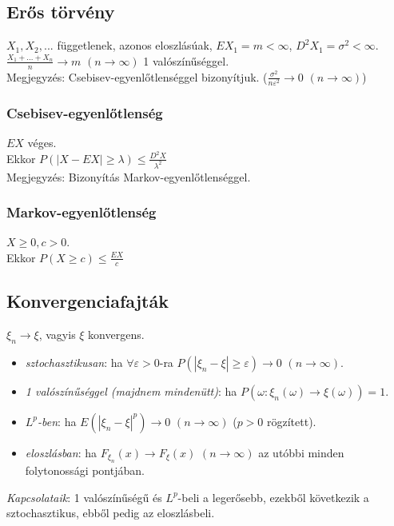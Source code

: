 \documentclass[margin=0px]{article}
\begin{document}
	\subsection{Erős törvény}
	
	$X_1, X_2, ...$ függetlenek, azonos eloszlásúak, $EX_1 = m < \infty$, $D^{2}X_1 = \sigma^2 < \infty$. \\
	$\frac{X_1 + ... + X_n}{n} \rightarrow m$ $(n \to \infty)$ 1 valószínűséggel. \\
	Megjegyzés: Csebisev-egyenlőtlenséggel bizonyítjuk. ($\frac{\sigma^2}{n \varepsilon^2} \to 0$ $(n \to \infty)$)
	
	\subsubsection{Csebisev-egyenlőtlenség}
	
	$EX$ véges. \\
	Ekkor $P(|X-EX| \geq \lambda) \leq \frac{D^{2}X}{\lambda^2}$ \\
	Megjegyzés: Bizonyítás Markov-egyenlőtlenséggel.
	
	\subsubsection{Markov-egyenlőtlenség}
	
	$X \geq 0, c > 0$. \\
	Ekkor $P(X \geq c) \leq \frac{EX}{c}$
	
	\subsection{Konvergenciafajták}
	
	$\xi_n \to \xi$, vagyis $\xi$ konvergens.
	\begin{itemize}
		\item \textit{sztochasztikusan}: ha $\forall \varepsilon > 0$-ra $P(|\xi_n - \xi| \geq \varepsilon) \rightarrow 0$ $(n \to \infty)$.
		\item \textit{1 valószínűséggel (majdnem mindenütt)}: ha $P(\omega : \xi_n(\omega) \to \xi(\omega)) = 1$.
		\item \textit{$L^p$-ben}: ha $E(|\xi_n - \xi|^p) \rightarrow 0$ $(n \to \infty)$ ($p>0$ rögzített).
		\item \textit{eloszlásban}: ha $F_{\xi_n}(x) \rightarrow F_{\xi}(x)$ $(n \to \infty)$ az utóbbi minden folytonossági pontjában.
	\end{itemize}
	\textit{Kapcsolataik}: 1 valószínűségű és $L^p$-beli a legerősebb, ezekből következik a sztochasztikus, ebből pedig az eloszlásbeli.
	
\end{document}
